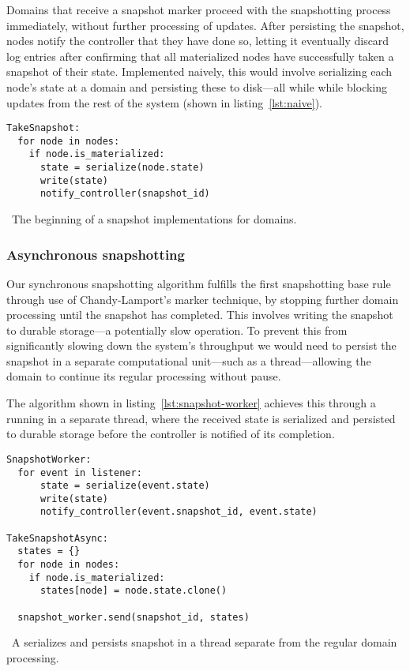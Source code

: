 Domains that receive a snapshot marker proceed with the snapshotting process
immediately, without further processing of updates. After persisting the
snapshot, nodes notify the controller that they have done so, letting it
eventually discard log entries after confirming that all materialized nodes have
successfully taken a snapshot of their state. Implemented naively, this would
involve serializing each node's state at a domain and persisting these to
disk---all while while blocking updates from the rest of the system (shown in
listing~\ref{lst:naive}).


\begin{listing}[H]
  \begin{verbatim}
TakeSnapshot:
  for node in nodes:
    if node.is_materialized:
      state = serialize(node.state)
      write(state)
      notify_controller(snapshot_id)
  \end{verbatim}
  \caption{\
    The beginning of a snapshot implementations for domains.
  }\label{lst:naive}
\end{listing}


\subsubsection{Asynchronous snapshotting}\label{sec:async-snapshot}

Our synchronous snapshotting algorithm fulfills the first snapshotting base rule
through use of Chandy-Lamport's marker technique, by stopping further domain
processing until the snapshot has completed. This involves writing the snapshot
to durable storage---a potentially slow operation. To prevent this from
significantly slowing down the system's throughput we would need to persist the
snapshot in a separate computational unit---such as a thread---allowing the
domain to continue its regular processing without pause.

The algorithm shown in listing~\ref{lst:snapshot-worker} achieves this through a
\code{SnapshotWorker} running in a separate thread, where the received state is
serialized and persisted to durable storage before the controller is notified of
its completion.

\begin{listing}[H]
  \begin{verbatim}
SnapshotWorker:
  for event in listener:
      state = serialize(event.state)
      write(state)
      notify_controller(event.snapshot_id, event.state)

TakeSnapshotAsync:
  states = {}
  for node in nodes:
    if node.is_materialized:
      states[node] = node.state.clone()

  snapshot_worker.send(snapshot_id, states)
  \end{verbatim}
  \caption{\
    A  serializes and persists snapshot in a thread
    separate from the regular domain processing.
  }\label{lst:snapshot-worker}
\end{listing}

